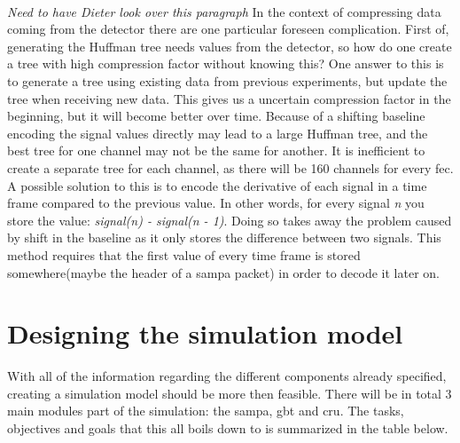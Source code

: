 \documentclass[a4paper]{report}
\begin{document}
\paragraph{}
\textit{Need to have Dieter look over this paragraph}
In the context of compressing data coming from the detector there are one particular foreseen complication.
First of, generating the Huffman tree needs values from the detector, so how do one create a tree with high compression factor without knowing this?
One answer to this is to generate a tree using existing data from previous experiments, but update the tree when receiving new data.
This gives us a uncertain compression factor in the beginning, but it will become better over time.
Because of a shifting baseline encoding the signal values directly may lead to a large Huffman tree, and the best tree for one channel may not be the same for another.
It is inefficient to create a separate tree for each channel, as there will be 160 channels for every \gls{fec}.
A possible solution to this is to encode the derivative of each signal in a time frame compared to the previous value.
In other words, for every signal \textit{n} you store the value: \textit{signal(n) - signal(n - 1)}.
Doing so takes away the problem caused by shift in the baseline as it only stores the difference between two signals.
This method requires that the first value of every time frame is stored somewhere(maybe the header of a \gls{sampa} packet) in order to decode it later on.

\section{Designing the simulation model}
With all of the information regarding the different components already specified, creating a simulation model should be more then feasible.
There will be in total 3 main modules part of the simulation: the \gls{sampa}, \gls{gbt} and \gls{cru}.
The tasks, objectives and goals that this all boils down to is summarized in the table below.
\end{document}
